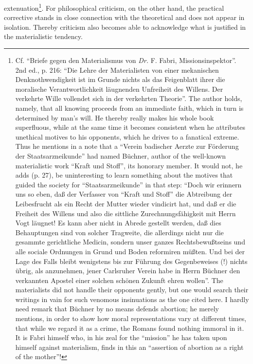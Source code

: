 \documentclass[12pt,a4paper,openany]{book}
\newcommand{\opage}[1]{\marginnote{\footnotesize\textit{[#1]}}}
\begin{document}
extenuation\footnote{Cf. ``Briefe gegen den Materialismus von \textit{Dr.} F. Fabri, Missionsinspektor''. 2nd ed., p. 216: ``Die Lehre der Materialisten von einer mekanischen Denknothwendigkeit ist im Grunde nichts als das Feigenblatt ihrer die moralische Verantwortlichkeit läugnenden Unfreiheit des Willens. Der verkehrte Wille vollendet sich in der verkehrten Theorie''. The author holds, namely, that all knowing proceeds from an immediate faith, which in turn is determined by man's will. He thereby really makes his whole book superfluous, while at the same time it becomes consistent when he attributes unethical motives to his opponents, which he drives to a fanatical extreme. Thus he mentions in a note that a ``Verein badischer Aerzte zur Förderung der Staatsarzneikunde'' had named Büchner, author of the well-known materialistic work ``Kraft und Stoff'', its honorary member. It would not, he adds (p. 27), be uninteresting to learn something about the motives that guided the society for ``Staatsarzneikunde'' in that step: ``Doch wir erinnern uns so eben, daß der Verfasser von ``Kraft und Stoff'' die Abtreibung der Leibesfrucht als ein Recht der Mutter wieder vindicirt hat, und daß er die Freiheit des Willens und also die sittliche Zurechnungsfähigkeit mit Herrn Vogt läugnet! Es kann aber nicht in Abrede gestellt werden, daß dies Behauptungen sind von solcher Tragweite, die allerdings nicht nur die gesammte gerichtliche Medicin, sondern unser ganzes Rechtsbewußtseins und alle sociale Ordnungen in Grund und Boden reformiren müßten. Und bei der Lage des Falls bleibt wenigstens bis zur Führung des Gegenbeweises (!) nichts übrig, als anzunehmen, jener Carlsruher Verein habe in Herrn Büchner den verkannten Apostel einer solchen schönen Zukunft ehren wollen''. The materialists did not handle their opponents gently, but one would search their writings in vain for such venomous insinuations as the one cited here. I hardly need remark that Büchner by no means defends abortion; he merely mentions, in order to show how moral representations vary at different times, that while we regard it as a crime, the Romans found nothing immoral in it. It is Fabri himself who, in his zeal for the ``mission'' he has taken upon himself against materialism, finds in this an ``assertion of abortion as a right of the mother''!}. For philosophical criticism, on the other hand,
\opage{199}the practical corrective stands in close connection with the
theoretical and does not appear in isolation. Thereby criticism
also becomes able to acknowledge what is justified in the materialistic
tendency.
\end{document}
